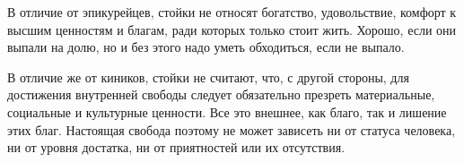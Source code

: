 
В отличие от эпикурейцев, стойки не относят богатство,
удовольствие, комфорт к высшим ценностям и благам, ради которых только стоит
жить. Хорошо, если они выпали на долю, но и без этого надо уметь обходиться,
если не выпало. 

В отличие же от киников, стойки не считают, что, с другой
стороны, для достижения внутренней свободы следует обязательно презреть
материальные, социальные и культурные ценности. Все это внешнее, как благо, так
и лишение этих благ. 
Настоящая свобода поэтому не может зависеть ни от статуса человека, ни от уровня достатка, ни от приятностей или их отсутствия. 

